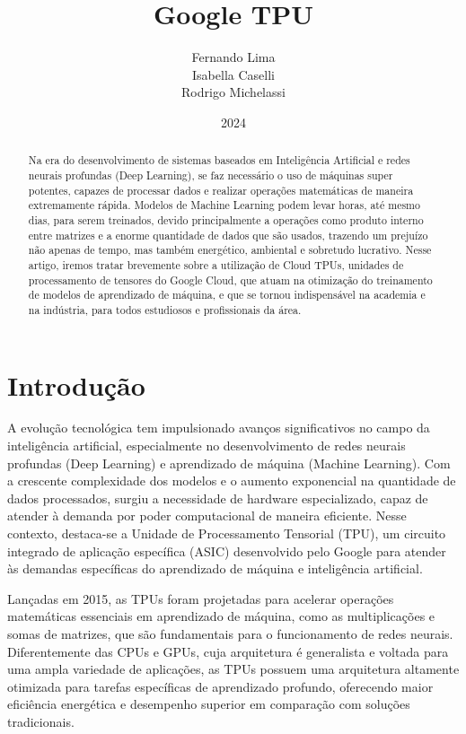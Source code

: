 \documentclass{report}
\title{Google TPU}
\author{Fernando Lima \\ Isabella Caselli \\ Rodrigo Michelassi}
\date{2024}
\begin{document}
\maketitle
\tableofcontents	%

\begin{abstract}
Na era do desenvolvimento de sistemas baseados em Inteligência Artificial e redes neurais profundas (Deep Learning), se faz necessário o uso de máquinas super potentes, capazes de processar dados e realizar operações matemáticas de maneira extremamente rápida. Modelos de Machine Learning podem levar horas, até mesmo dias, para serem treinados, devido principalmente a operações como produto interno entre matrizes e a enorme quantidade de dados que são usados, trazendo um prejuízo não apenas de tempo, mas também energético, ambiental e sobretudo lucrativo. Nesse artigo, iremos tratar brevemente sobre a utilização de Cloud TPUs, unidades de processamento de tensores do Google Cloud, que atuam na otimização do treinamento de modelos de aprendizado de máquina, e que se tornou indispensável na academia e na indústria, para todos estudiosos e profissionais da área.
\end{abstract}

\chapter{Introdução}

A evolução tecnológica tem impulsionado avanços significativos no campo da inteligência artificial, especialmente no desenvolvimento de redes neurais profundas (Deep Learning) e aprendizado de máquina (Machine Learning). Com a crescente complexidade dos modelos e o aumento exponencial na quantidade de dados processados, surgiu a necessidade de hardware especializado, capaz de atender à demanda por poder computacional de maneira eficiente. Nesse contexto, destaca-se a Unidade de Processamento Tensorial (TPU), um circuito integrado de aplicação específica (ASIC) desenvolvido pelo Google para atender às demandas específicas do aprendizado de máquina e inteligência artificial.

Lançadas em 2015, as TPUs foram projetadas para acelerar operações matemáticas essenciais em aprendizado de máquina, como as multiplicações e somas de matrizes, que são fundamentais para o funcionamento de redes neurais. Diferentemente das CPUs e GPUs, cuja arquitetura é generalista e voltada para uma ampla variedade de aplicações, as TPUs possuem uma arquitetura altamente otimizada para tarefas específicas de aprendizado profundo, oferecendo maior eficiência energética e desempenho superior em comparação com soluções tradicionais.
\end{document}
